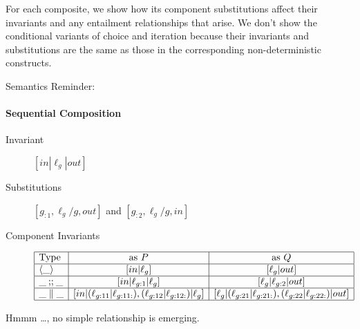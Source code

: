 For each composite,
we show how its component substitutions affect their invariants
and any entailment relationships that arise.
We don't show the conditional variants of choice and iteration
because their invariants and substitutions are the same as those
in the corresponding non-deterministic constructs.

Semantics Reminder:


\paragraph{Sequential Composition}

\begin{description}
  \item[Invariant]
    $[in|\ell_g|out]$
  \item[Substitutions]
    $[g_{:1},\ell_g/g,out]$ and $[g_{:2},\ell_g/g,in]$
  \item[Component Invariants]
    $$\begin{array}{|l|c|c|}
    \hline
      \mbox{Type} & \mbox{as }P & \mbox{as }Q
    \\\hline
      \langle\_\rangle & [in|\ell_g] & [\ell_g|out]
    \\\hline
       \_\mathbin{;\!;}\_& [in|\ell_{g:1}|\ell_g] & [\ell_g|\ell_{g:2}|out]
    \\\hline
       \_\parallel\_
       & [in|(\ell_{g:11}|\ell_{g:11:}),(\ell_{g:12}|\ell_{g:12:})|\ell_g]
       & [\ell_g|(\ell_{g:21}|\ell_{g:21:}),(\ell_{g:22}|\ell_{g:22:})|out]
    \\\hline
    \end{array}$$
\end{description}
Hmmm \dots, no simple relationship is emerging.
